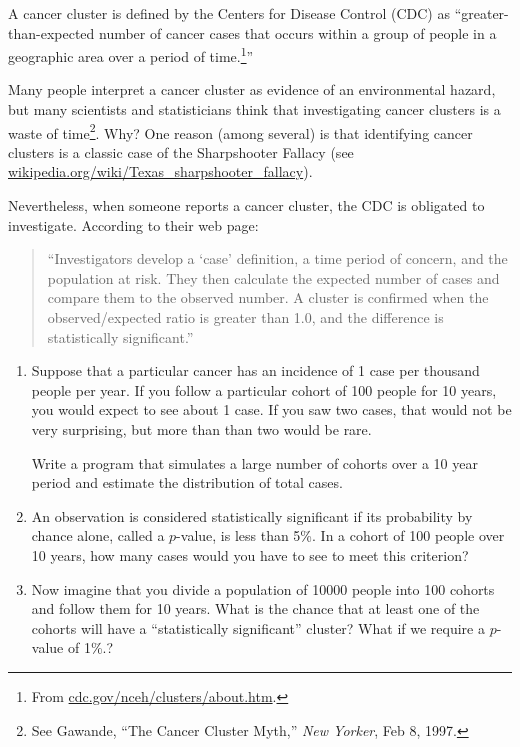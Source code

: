 \documentclass[10pt]{book}
\begin{document}
\begin{ex}

A cancer cluster is defined by the Centers for Disease Control (CDC)
as ``greater-than-expected number of cancer cases that occurs within a
group of people in a geographic area over a period of
time.\footnote{From \url{cdc.gov/nceh/clusters/about.htm}.}''

Many people interpret a cancer cluster as evidence of an environmental
hazard, but many scientists and statisticians think that investigating
cancer clusters is a waste of time\footnote{See Gawande, ``The Cancer
  Cluster Myth,'' {\em New Yorker}, Feb 8, 1997.}.  Why?  One reason
(among several) is that identifying cancer clusters is a classic case
of the Sharpshooter Fallacy (see
\url{wikipedia.org/wiki/Texas_sharpshooter_fallacy}).

Nevertheless, when someone reports a cancer cluster, the CDC is
obligated to investigate.  According to their web page:

\begin{quote}

``Investigators develop a `case' definition, a time period of concern,
  and the population at risk. They then calculate the expected number
  of cases and compare them to the observed number. A cluster is
  confirmed when the observed/expected ratio is greater than 1.0, and
  the difference is statistically significant.''

\end{quote}

\begin{enumerate}

\item Suppose that a particular cancer has an incidence of 1 case
per thousand people per year.  If you follow a particular cohort
of 100 people for 10 years, you would expect to see about 1 case.
If you saw two cases, that would not be very surprising, but more
than than two would be rare.  

Write a program that simulates a large number of cohorts over
a 10 year period and estimate the distribution of total cases.

\item An observation is considered statistically significant if its
  probability by chance alone, called a $p$-value, is less than 5\%.
  In a cohort of 100 people over 10 years, how many cases would you
  have to see to meet this criterion?

\item Now imagine that you divide a population of 10000 people into 100
  cohorts and follow them for 10 years.  What is the chance that at
  least one of the cohorts will have a ``statistically significant''
  cluster?  What if we require a $p$-value of 1\%.?


\end{enumerate}
\end{ex}
\end{document}
